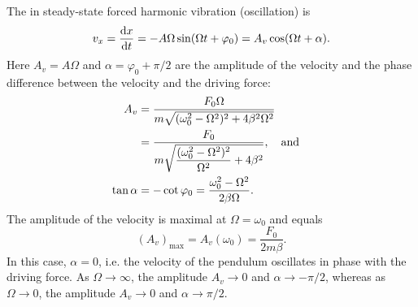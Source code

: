 \subsection{}\label{29.2.4} The  in steady-state forced harmonic vibration (oscillation) is
\begin{equation*}%
v_{x} = \dv{x}{t} = - A \Omega \sin ( \Omega t + \varphi_{0}) = A_{v}\cos(\Omega t + \alpha).
\end{equation*}
Here $A_{v} = A\Omega$ and $\alpha = \varphi_{0} + \pi/2$ are the amplitude of the velocity and the phase difference between the velocity and the driving force:
\begin{align*}%
A_{v} &= \frac{F_{0}\Omega}{m \sqrt{(\omega_{0}^{2} - \Omega^{2})^{2}+ 4\beta^{2}\Omega^{2}}}\\ &=  \frac{F_{0}}{m \sqrt{\dfrac{(\omega_{0}^{2} - \Omega^{2})^{2}}{\Omega^{2}} + 4 \beta^{2}}}, \qand \\ 
\tan \alpha & = -\cot \varphi_{0} = \frac{\omega_{0}^{2} - \Omega^{2}}{2 \beta \Omega}.
\end{align*}
The amplitude of the velocity is maximal at $\Omega = \omega_{0}$ and equals
\begin{equation*}%
(A_{v})_{\text{max}} = A_{v} (\omega_{0}) = \frac{F_{0}}{2m \beta}.
\end{equation*}
In this case, $\alpha = 0$, i.e. the velocity of the pendulum oscillates in phase with the driving force. As $\Omega \to \infty$, the amplitude $A_{v} \to 0$ and $\alpha \to -\pi/2$, whereas as $\Omega \to 0$, the amplitude $A_{v} \to 0$ and $\alpha \to \pi/2$.

